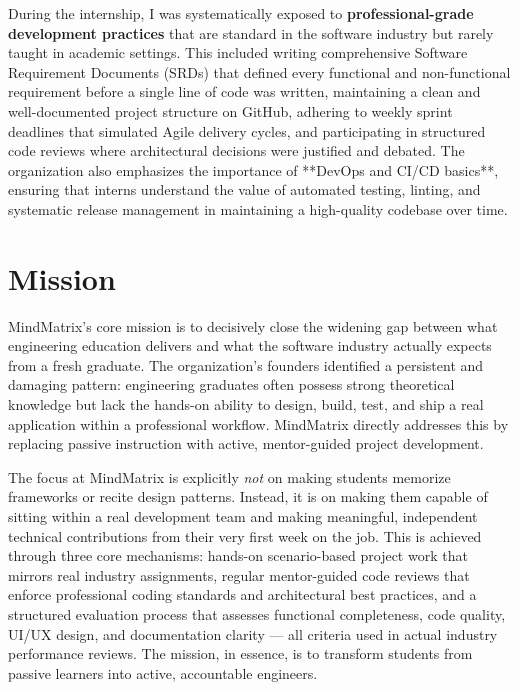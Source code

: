 \documentclass[12pt,a4paper]{report}
\begin{document}
\vspace{0.4cm}

During the internship, I was systematically exposed to \textbf{professional-grade development practices} that are standard in the software industry but rarely taught in academic settings. This included writing comprehensive Software Requirement Documents (SRDs) that defined every functional and non-functional requirement before a single line of code was written, maintaining a clean and well-documented project structure on GitHub, adhering to weekly sprint deadlines that simulated Agile delivery cycles, and participating in structured code reviews where architectural decisions were justified and debated. The organization also emphasizes the importance of **DevOps and CI/CD basics**, ensuring that interns understand the value of automated testing, linting, and systematic release management in maintaining a high-quality codebase over time.

\section{Mission}

MindMatrix's core mission is to decisively close the widening gap between what engineering education delivers and what the software industry actually expects from a fresh graduate. The organization's founders identified a persistent and damaging pattern: engineering graduates often possess strong theoretical knowledge but lack the hands-on ability to design, build, test, and ship a real application within a professional workflow. MindMatrix directly addresses this by replacing passive instruction with active, mentor-guided project development.

\vspace{0.4cm}

The focus at MindMatrix is explicitly \textit{not} on making students memorize frameworks or recite design patterns. Instead, it is on making them capable of sitting within a real development team and making meaningful, independent technical contributions from their very first week on the job. This is achieved through three core mechanisms: hands-on scenario-based project work that mirrors real industry assignments, regular mentor-guided code reviews that enforce professional coding standards and architectural best practices, and a structured evaluation process that assesses functional completeness, code quality, UI/UX design, and documentation clarity — all criteria used in actual industry performance reviews. The mission, in essence, is to transform students from passive learners into active, accountable engineers.
\end{document}
